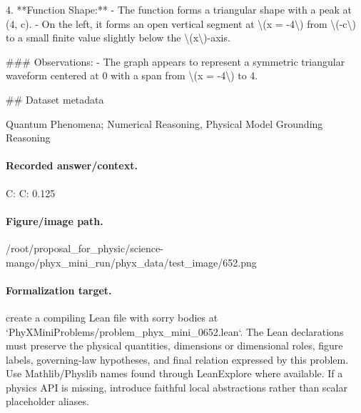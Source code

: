 4. **Function Shape:**
   - The function forms a triangular shape with a peak at (4, c).
   - On the left, it forms an open vertical segment at \textbackslash{}(x = -4\textbackslash{}) from \textbackslash{}(-c\textbackslash{}) to a small finite value slightly below the \textbackslash{}(x\textbackslash{})-axis.

\#\#\# Observations:
- The graph appears to represent a symmetric triangular waveform centered at 0 with a span from \textbackslash{}(x = -4\textbackslash{}) to 4.

\#\# Dataset metadata

Quantum Phenomena; Numerical Reasoning, Physical Model Grounding Reasoning

\paragraph{Recorded answer/context.}
C: C: 0.125

\paragraph{Figure/image path.}
/root/proposal\_for\_physic/science-mango/phyx\_mini\_run/phyx\_data/test\_image/652.png

\paragraph{Formalization target.}
create a compiling Lean file with sorry bodies at `PhyXMiniProblems/problem\_phyx\_mini\_0652.lean`. The Lean declarations must preserve the physical quantities, dimensions or dimensional roles, figure labels, governing-law hypotheses, and final relation expressed by this problem.
Use Mathlib/Physlib names found through LeanExplore where available. If a physics API is missing, introduce faithful local abstractions rather than scalar placeholder aliases.

